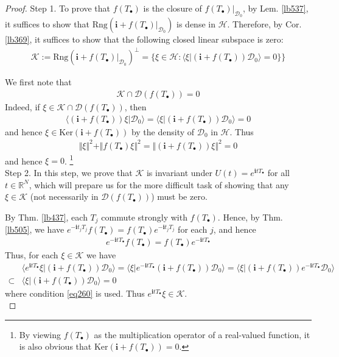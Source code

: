\documentclass[12pt,b5paper,notitlepage]{article}
\theoremstyle{definition}
\theoremstyle{plain}
\newcommand{\Dom}{\mathscr{D}}
\newcommand{\bk}[1]{\langle {#1}\rangle}
\newcommand{\im}{\mathbf{i}}
\newcommand{\blt}{\bullet}
\newcommand{\Rbb}{\mathbb R}
\newcommand{\Ker}{\mathrm{Ker}}
\newcommand{\Rng}{\mathrm{Rng}}
\newcommand{\MH}{\mathcal H}
\newcommand{\MK}{\mathcal K}
\numberwithin{equation}{section}
\begin{document}
\begin{proof}
Step 1. To prove that $f(T_\blt)$ is the closure of $f(T_\blt)|_{\Dom_0}$, by Lem. \ref{lb537}, it suffices to show that $\Rng(\im+f(T_\blt)|_{\Dom_0})$ is dense in $\MH$. Therefore, by Cor. \ref{lb369}, it suffices to show that the following closed linear subspace is zero:
\begin{align*}
\MK:=\Rng(\im+f(T_\blt)|_{\Dom_0})^\perp=\{\xi\in\MH:\bk{\xi|(\im+f(T_\blt))\Dom_0}=0\}\}
\end{align*}


We first note that
\begin{align*}
\MK\cap\Dom(f(T_\blt))=0
\end{align*}
Indeed, if $\xi\in \MK\cap\Dom(f(T_\blt))$, then
\begin{align*}
\bk{(\im+f(T_\blt))\xi|\Dom_0}=\bk{\xi|(\im+f(T_\blt))\Dom_0}=0
\end{align*}
and hence $\xi\in\Ker(\im+f(T_\blt))$ by the density of $\Dom_0$ in $\MH$. Thus
\begin{align*}
\Vert\xi\Vert^2+\Vert f(T_\blt)\xi\Vert^2=\Vert (\im+f(T_\blt))\xi\Vert^2=0
\end{align*}
and hence $\xi=0$. \footnote{By viewing $f(T_\blt)$ as the multiplication operator of a real-valued function, it is also obvious that $\Ker(\im+f(T_\blt))=0$.}\\[-1ex]


Step 2. In this step, we prove that $\MK$ is invariant under $U(t)=e^{\im tT_\blt}$ for all $t\in\Rbb^N$, which will prepare us for the more difficult task of showing that any $\xi\in\MK$ (not necessarily in $\Dom(f(T_\blt))$) must be zero.

By Thm. \ref{lb437}, each $T_j$ commute strongly with $f(T_\blt)$. Hence, by Thm. \ref{lb505}, we have $e^{-\im t_jT_j}f(T_\blt)=f(T_\blt)e^{-\im t_jT_j}$ for each $j$, and hence
\begin{align*}
e^{-\im tT_\blt}f(T_\blt)= f(T_\blt)e^{-\im tT_\blt}
\end{align*}
Thus, for each $\xi\in\MK$ we have
\begin{align*}
&\bk{e^{\im tT_\blt}\xi|(\im+f(T_\blt))\Dom_0}=\bk{\xi|e^{-\im tT_\blt}(\im+f(T_\blt))\Dom_0}=\bk{\xi|(\im+f(T_\blt))e^{-\im tT_\blt}\Dom_0}\\
\subset&\bk{\xi|(\im+f(T_\blt))\Dom_0}=0
\end{align*}
where condition \eqref{eq260} is used. Thus $e^{\im tT_\blt}\xi\in\MK$. \\[-1ex]


\end{proof}
\end{document}
